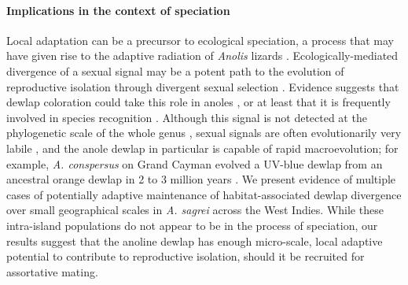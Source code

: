 \paragraph{Implications in the context of speciation} Local adaptation can be a precursor to ecological speciation, a process that may have given rise to the adaptive radiation of \textit{Anolis} lizards \citep{Harmon2003, Gavrilets2009}. Ecologically-mediated divergence of a sexual signal may be a potent path to the evolution of reproductive isolation through divergent sexual selection \citep{Reynolds2007, Servedio2011}. Evidence suggests that dewlap coloration could take this role in anoles \citep{Ng2011, Lambert2013, Geneva2015, Ng2017}, or at least that it is frequently involved in species recognition \citep{Williams1969, Williams1977, Losos1985, Macedonia1994, Fleishman2000, Macedonia2013, Ingram2016, Baeckens2018}. Although this signal is not detected at the phylogenetic scale of the whole genus \citep{Nicholson2007, Harrison2012, Ingram2016}, sexual signals are often evolutionarily very labile \citep{Kraaijeveld2011}, and the anole dewlap in particular is capable of rapid macroevolution; for example, \textit{A. conspersus} on Grand Cayman evolved a UV-blue dewlap from an ancestral orange dewlap in 2 to 3 million years \citep{Macedonia2001}. We present evidence of multiple cases of potentially adaptive maintenance of habitat-associated dewlap divergence over small geographical scales in \textit{A. sagrei} across the West Indies. While these intra-island populations do not appear to be in the process of speciation, our results suggest that the anoline dewlap has enough micro-scale, local adaptive potential to contribute to reproductive isolation, should it be recruited for assortative mating.